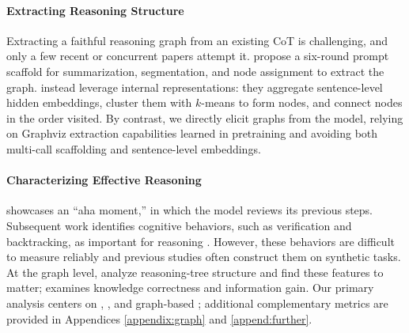 \paragraph{Extracting Reasoning Structure} \quad {}  Extracting a faithful reasoning graph from an existing CoT is challenging, and only a few recent or concurrent papers attempt it. \citet{jiang2025makes} propose a six-round prompt scaffold for summarization, segmentation, and node assignment to extract the graph. \citet{minegishi2025topology} instead leverage internal representations: they aggregate sentence-level hidden embeddings, cluster them with $k$-means to form nodes, and connect nodes in the order visited. By contrast, we directly elicit graphs from the model, relying on Graphviz extraction capabilities learned in pretraining and avoiding both multi-call scaffolding and sentence-level embeddings.

\paragraph{Characterizing Effective Reasoning}  \citet{guo2025deepseek} showcases an “aha moment,” in which the model reviews its previous steps. Subsequent work identifies cognitive behaviors, such as verification and backtracking, as important for reasoning \citep{gandhi2025cognitive, hu2025beyond}. However, these behaviors are difficult to measure reliably and previous studies often construct them on synthetic tasks. At the graph level, \citet{jiang2025makes, minegishi2025topology} analyze reasoning-tree structure and find these features to matter; \citet{wu2025knowledge} examines knowledge correctness and information gain. Our primary analysis centers on \Length, \rr, and graph-based \fsf; additional complementary metrics are provided in Appendices \ref{appendix:graph} and \ref{append:further}.






